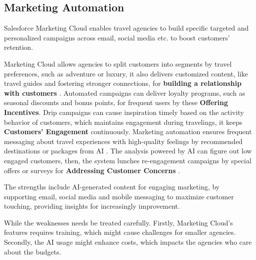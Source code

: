 \subsection{Marketing Automation}
Salesforce Marketing Cloud enables travel agencies to build specific targeted and personalized campaigns across email, social media etc. to boost customers' retention.

Marketing Cloud allows agencies to split customers into segments by travel preferences, such as adventure or luxury, it also delivers customized content, like travel guides and fostering stronger connections, for \textbf{building a relationship with customers} \cite{SalesforceMarketingCloud2025}. Automated campaigns can deliver loyalty programs, such as seasonal discounts and bonus points, for frequent users by these \textbf{Offering Incentives}. Drip campaigns can cause inspiration timely based on the activity behavior of customers, which maintains engagement during travelings, it keeps \textbf{Customers' Engagement} continuously. Marketing automation ensures frequent messaging about travel experiences with high-quality feelings by recommended destinations or packages from AI \cite{SalesforceMarketingCloud2025}. The analysis powered by AI can figure out low engaged customers, then, the system lunches re-engagement campaigns by special offers or surveys for \textbf{Addressing Customer Concerns} \cite{SalesforceEinstein2025}. 

The strengths include AI-generated content for engaging marketing, by supporting email, social media and mobile messaging to maximize customer touching, providing insights for increasingly improvement. 

While the weaknesses needs be treated carefully. Firstly, Marketing Cloud's features requires training, which might cause challenges for smaller agencies. Secondly, the AI usage might enhance costs, which impacts the agencies who care about the budgets.